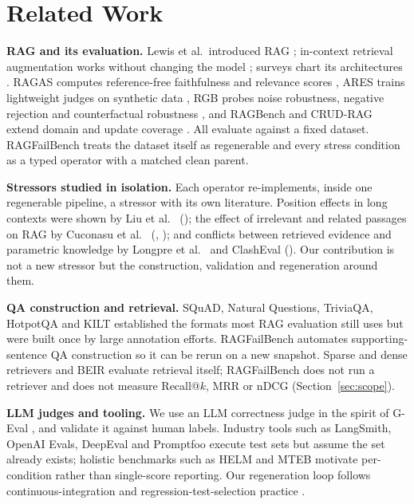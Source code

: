\documentclass[conference]{IEEEtran}
\newcommand{\op}[1]{\texttt{\detokenize{#1}}}
\begin{document}
\section{Related Work}
\textbf{RAG and its evaluation.} Lewis et al.\ introduced RAG \cite{lewis2020rag}; in-context
retrieval augmentation works without changing the model \cite{ram2023incontext}; surveys chart
its architectures \cite{gao2023survey,zhao2024survey,huang2024survey}. RAGAS computes
reference-free faithfulness and relevance scores \cite{es2024ragas}, ARES trains lightweight
judges on synthetic data \cite{saadfalcon2024ares}, RGB probes noise robustness, negative
rejection and counterfactual robustness \cite{chen2024rgb}, and RAGBench and CRUD-RAG extend
domain and update coverage \cite{friel2024ragbench,lyu2024crud}. All evaluate against a fixed
dataset. RAGFailBench treats the dataset itself as regenerable and every stress condition as a
typed operator with a matched clean parent.

\textbf{Stressors studied in isolation.} Each operator re-implements, inside one regenerable
pipeline, a stressor with its own literature. Position effects in long contexts were shown by
Liu et al.\ \cite{liu2024lost} (\op{evidence_position}); the effect of irrelevant and related
passages on RAG by Cuconasu et al.\ \cite{cuconasu2024noise} (\op{context_noise},
\op{hard_negative}); and conflicts between retrieved evidence and parametric knowledge by
Longpre et al.\ \cite{longpre2021entity} and ClashEval \cite{wu2024clasheval}
(\op{conflict}). Our contribution is not a new stressor but the construction, validation and
regeneration around them.

\textbf{QA construction and retrieval.} SQuAD, Natural Questions, TriviaQA, HotpotQA and KILT
established the formats most RAG evaluation still uses
\cite{rajpurkar2016squad,kwiatkowski2019nq,joshi2017triviaqa,yang2018hotpotqa,petroni2021kilt}
but were built once by large annotation efforts. RAGFailBench automates supporting-sentence QA
construction so it can be rerun on a new snapshot. Sparse and dense retrievers
\cite{robertson2009bm25,karpukhin2020dpr,izacard2022contriever,khattab2020colbert,santhanam2022colbertv2}
and BEIR \cite{thakur2021beir} evaluate retrieval itself; RAGFailBench does not run a retriever
and does not measure Recall@$k$, MRR or nDCG (Section~\ref{sec:scope}).

\textbf{LLM judges and tooling.} We use an LLM correctness judge in the spirit of G-Eval
\cite{liu2023geval}, and validate it against human labels. Industry tools such as LangSmith,
OpenAI Evals, DeepEval and Promptfoo \cite{langsmith,openaievals,deepeval,promptfoo} execute
test sets but assume the set already exists; holistic benchmarks such as HELM and MTEB
\cite{liang2022helm,muennighoff2023mteb} motivate per-condition rather than single-score
reporting. Our regeneration loop follows continuous-integration and regression-test-selection
practice \cite{fowler2006ci,rothermel1996regression}.
\end{document}
